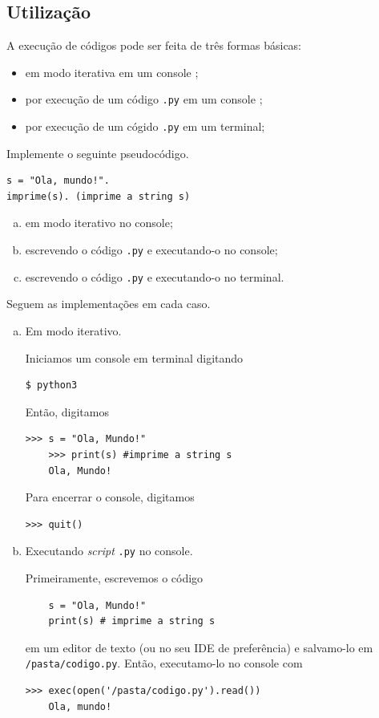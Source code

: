 \documentclass[12pt]{article}
\begin{document}
\subsection{Utilização}

A execução de códigos \python pode ser feita de três formas básicas:
\begin{itemize}
\item em modo iterativa em um console \python;
\item por execução de um código \verb+.py+ em um console \python;
\item por execução de um cógido \verb+.py+ em um terminal;
\end{itemize}

\begin{ex}
  Implemente o seguinte pseudocódigo.
\begin{verbatim}
s = "Ola, mundo!".
imprime(s). (imprime a string s)
\end{verbatim}
  \begin{enumerate}[a)]
  \item em modo iterativo no console;
  \item escrevendo o código \verb+.py+ e executando-o no console;
  \item escrevendo o código \verb+.py+ e executando-o no terminal.
  \end{enumerate}
  
   Seguem as implementações em cada caso.

  \begin{enumerate}[a)]
  \item Em modo iterativo.

    Iniciamos um console {\python} em terminal digitando
\begin{verbatim}
$ python3
\end{verbatim}
    Então, digitamos
    \begin{lstlisting}[xleftmargin=-3em]
    >>> s = "Ola, Mundo!"
    >>> print(s) #imprime a string s
    Ola, Mundo!
    \end{lstlisting}
    Para encerrar o console, digitamos
    \begin{lstlisting}[xleftmargin=-3em]
    >>> quit()
    \end{lstlisting}
    
  \item Executando {\it script} \verb+.py+ no console.

    Primeiramente, escrevemos o código
    \begin{lstlisting}
    s = "Ola, Mundo!"
    print(s) # imprime a string s
    \end{lstlisting}
    em um editor de texto (ou no seu IDE de preferência) e salvamo-lo em \verb+/pasta/codigo.py+. Então, executamo-lo no console {\python} com
    \begin{lstlisting}[xleftmargin=-3em]
    >>> exec(open('/pasta/codigo.py').read())
    Ola, mundo!
    \end{lstlisting}


\end{enumerate}
\end{ex}
\end{document}
